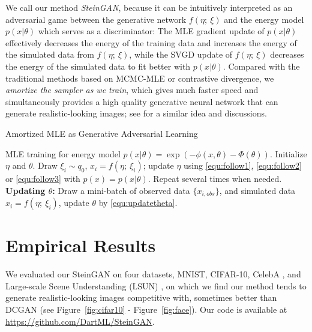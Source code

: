 \documentclass{article} \usepackage{iclr2017_conference,times}
\begin{document}
We call our method \emph{SteinGAN}, because it can be intuitively
interpreted as an adversarial game between 
the generative network $f(\eta;~\xi)$ and 
the energy model $p(x|\theta)$ which serves as a discriminator:
The MLE gradient update of $p(x|\theta)$ effectively decreases the energy of the training data and increases the energy of the simulated data from $f(\eta;~\xi)$, while the SVGD update of $f(\eta;~\xi)$ decreases the energy of the simulated data to fit better with $p(x|\theta)$.  
Compared with the traditional methods based on MCMC-MLE or contrastive divergence, we \emph{amortize the sampler as we train}, which gives much faster speed and simultaneously provides a high quality generative neural network that can generate realistic-looking images; see \citet{kim2016deep} for a similar idea and discussions. 


\begin{algorithm}[t]                      \caption{Amortized MLE as Generative Adversarial Learning}\label{alg:gan}                           \begin{algorithmic}                     MLE training for energy model $p(x|\theta) = \exp(-\phi(x,\theta) - \Phi(\theta))$.
\STATE Initialize $\eta$ and $\theta$. 
 Draw $\xi_i\sim q_0$, $x_i = f(\eta;~\xi_i)$; update $\eta$ using \eqref{equ:follow1}, \eqref{equ:follow2} or \eqref{equ:follow3} with $p(x)=p(x|\theta)$. Repeat several times when needed. 
\STATE 
 {\bf Updating $\theta$:}  Draw a mini-batch of observed data $\{x_{i,obs}\}$, and simulated data $x_i = f(\eta;~\xi_i)$, update $\theta$ by \eqref{equ:updatetheta}. 
\ENDFOR
\end{algorithmic}
\end{algorithm}


\section{Empirical Results}  \label{sec:gan}

We evaluated our SteinGAN on four datasets,  
MNIST, CIFAR-10, CelebA \citep{liu2015faceattributes}, and Large-scale Scene Understanding (LSUN) \citep{yu2015lsun}, on which we find our method tends to generate realistic-looking images competitive with, sometimes better than DCGAN \citep{radford2015unsupervised} (see Figure~\ref{fig:cifar10} - Figure~\ref{fig:face}). 
Our code is available at \url{https://github.com/DartML/SteinGAN}.

\newcommand{\enc}{\mathrm{E}}
\newcommand{\dec}{\mathrm{D}}
\end{document}
